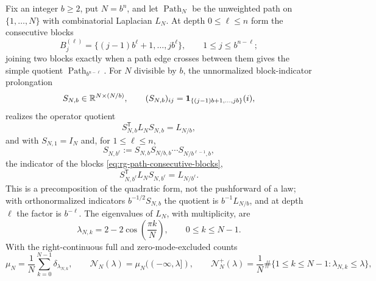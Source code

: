 Fix an integer \(b\geq2\), put \(N=b^n\), and let \(\operatorname{Path}_N\) be the
unweighted path on \(\{1,\ldots,N\}\) with combinatorial Laplacian \(L_N\). At
depth \(0\leq\ell\leq n\) form the consecutive blocks
\begin{equation}
B_j^{(\ell)}=\{(j-1)b^\ell+1,\ldots,jb^\ell\},
\qquad1\leq j\leq b^{n-\ell};
\label{eq:rg-path-consecutive-blocks}
\end{equation}
joining two blocks exactly when a path edge crosses between them gives the
simple quotient \(\operatorname{Path}_{b^{n-\ell}}\). For \(N\) divisible by
\(b\), the unnormalized block-indicator prolongation
\begin{equation}
S_{N,b}\in\mathbb R^{N\times(N/b)},
\qquad
(S_{N,b})_{ij}=\mathbf1_{\{(j-1)b+1,\ldots,jb\}}(i),
\label{eq:rg-path-block-indicator}
\end{equation}
realizes the operator quotient
\begin{equation}
S_{N,b}^{\mathsf T}L_NS_{N,b}=L_{N/b},
\label{eq:rg-path-galerkin-quotient}
\end{equation}
and with \(S_{N,1}=I_N\) and, for \(1\leq\ell\leq n\),
\begin{equation}
S_{N,b^\ell}:=S_{N,b}S_{N/b,b}\cdots S_{N/b^{\ell-1},b},
\label{eq:rg-path-depth-block-indicator}
\end{equation}
the indicator of the blocks \eqref{eq:rg-path-consecutive-blocks},
\begin{equation}
S_{N,b^\ell}^{\mathsf T}L_NS_{N,b^\ell}=L_{N/b^\ell}.
\label{eq:rg-path-depth-galerkin-quotient}
\end{equation}
This is a precomposition of the quadratic form, not the pushforward of a law;
with orthonormalized indicators \(b^{-1/2}S_{N,b}\) the quotient is
\(b^{-1}L_{N/b}\), and at depth \(\ell\) the factor is \(b^{-\ell}\). The
eigenvalues of \(L_N\), with multiplicity, are
\begin{equation}
\lambda_{N,k}=2-2\cos\left(\frac{\pi k}{N}\right),
\qquad0\leq k\leq N-1.
\label{eq:rg-path-laplacian-eigenvalues}
\end{equation}
With the right-continuous full and zero-mode-excluded counts
\begin{equation}
\mu_N=\frac1N\sum_{k=0}^{N-1}\delta_{\lambda_{N,k}},
\qquad
\mathcal N_N(\lambda)=\mu_N((-\infty,\lambda]),
\qquad
\mathcal N^+_N(\lambda)=\frac1N
\#\{1\leq k\leq N-1:\lambda_{N,k}\leq\lambda\},
\label{eq:rg-path-spectral-counts}
\end{equation}
